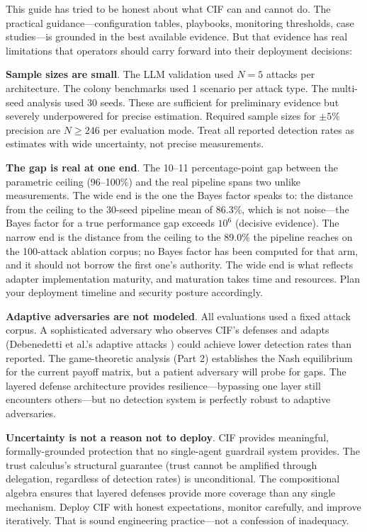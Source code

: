 \documentclass[
]{article}
\begin{document}
This guide has tried to be honest about what CIF can and cannot do. The
practical guidance---configuration tables, playbooks, monitoring
thresholds, case studies---is grounded in the best available evidence.
But that evidence has real limitations that operators should carry
forward into their deployment decisions:

\textbf{Sample sizes are small}. The LLM validation used \(N=5\) attacks
per architecture. The colony benchmarks used 1 scenario per attack type.
The multi-seed analysis used 30 seeds. These are sufficient for
preliminary evidence but severely underpowered for precise estimation.
Required sample sizes for \(\pm 5\%\) precision are \(N \geq 246\) per
evaluation mode. Treat all reported detection rates as estimates with
wide uncertainty, not precise measurements.

\textbf{The gap is real at one end}. The 10--11 percentage-point gap
between the parametric ceiling (96--100\%) and the real pipeline spans
two unlike measurements. The wide end is the one the Bayes factor speaks
to: the distance from the ceiling to the 30-seed pipeline mean of
86.3\%, which is not noise---the Bayes factor for a true performance gap
exceeds \(10^6\) (decisive evidence). The narrow end is the distance
from the ceiling to the 89.0\% the pipeline reaches on the 100-attack
ablation corpus; no Bayes factor has been computed for that arm, and it
should not borrow the first one's authority. The wide end is what
reflects adapter implementation maturity, and maturation takes time and
resources. Plan your deployment timeline and security posture
accordingly.

\textbf{Adaptive adversaries are not modeled}. All evaluations used a
fixed attack corpus. A sophisticated adversary who observes CIF's
defenses and adapts (Debenedetti et al.'s adaptive attacks
\cite{adaptive2025attacks}) could achieve lower detection rates than
reported. The game-theoretic analysis (Part 2) establishes the Nash
equilibrium for the current payoff matrix, but a patient adversary will
probe for gaps. The layered defense architecture provides
resilience---bypassing one layer still encounters others---but no
detection system is perfectly robust to adaptive adversaries.

\textbf{Uncertainty is not a reason not to deploy}. CIF provides
meaningful, formally-grounded protection that no single-agent guardrail
system provides. The trust calculus's structural guarantee (trust cannot
be amplified through delegation, regardless of detection rates) is
unconditional. The compositional algebra ensures that layered defenses
provide more coverage than any single mechanism. Deploy CIF with honest
expectations, monitor carefully, and improve iteratively. That is sound
engineering practice---not a confession of inadequacy.
\end{document}
